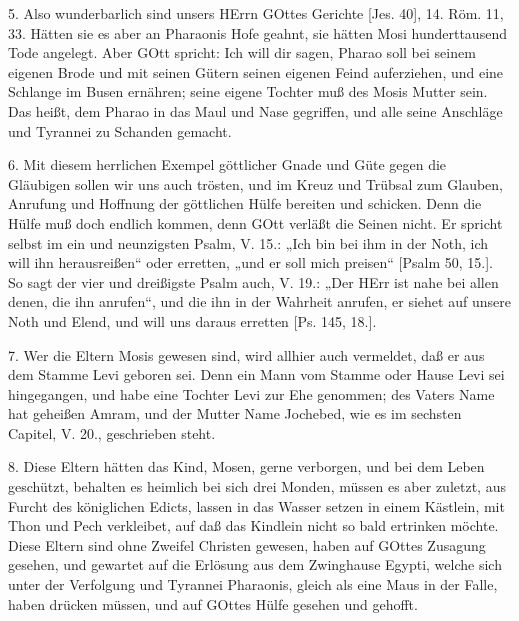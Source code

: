 5. Also wunderbarlich sind unsers HErrn GOttes Gerichte [Jes. 40], 14. Röm. 11, 33. Hätten sie es aber an Pharaonis Hofe geahnt, sie hätten Mosi hunderttausend Tode angelegt. Aber GOtt spricht: Ich will dir sagen, Pharao soll bei seinem eigenen Brode und mit seinen Gütern seinen eigenen Feind auferziehen, und eine Schlange im Busen ernähren; seine eigene Tochter muß des Mosis Mutter sein. Das heißt, dem Pharao in das Maul und Nase gegriffen, und alle seine Anschläge und Tyrannei zu Schanden gemacht.

6. Mit diesem herrlichen Exempel göttlicher Gnade und Güte gegen die Gläubigen sollen wir uns auch trösten, und im Kreuz und Trübsal zum Glauben, Anrufung und Hoffnung der göttlichen Hülfe bereiten und schicken. Denn die Hülfe muß doch endlich kommen, denn GOtt verläßt die Seinen nicht. Er spricht selbst im ein und neunzigsten Psalm, V. 15.: „Ich bin bei ihm in der Noth, ich will ihn herausreißen“ oder erretten, „und er soll mich preisen“ [Psalm 50, 15.]. So sagt der vier und dreißigste Psalm auch, V. 19.: „Der HErr ist nahe bei allen denen, die ihn anrufen“, und die ihn in der Wahrheit anrufen, er siehet auf unsere Noth und Elend, und will uns daraus erretten [Ps. 145, 18.].

7. Wer die Eltern Mosis gewesen sind, wird allhier auch vermeldet, daß er aus dem Stamme Levi geboren sei. Denn ein Mann vom Stamme oder Hause Levi sei hingegangen, und habe eine Tochter Levi zur Ehe genommen; des Vaters Name hat geheißen Amram, und der Mutter Name Jochebed, wie es im sechsten Capitel, V. 20., geschrieben steht.

8. Diese Eltern hätten das Kind, Mosen, gerne verborgen, und bei dem Leben geschützt, behalten es heimlich bei sich drei Monden, müssen es aber zuletzt, aus Furcht des königlichen Edicts, lassen in das Wasser setzen in einem Kästlein, mit Thon und Pech verkleibet, auf daß das Kindlein nicht so bald ertrinken möchte. Diese Eltern sind ohne Zweifel Christen gewesen, haben auf GOttes Zusagung gesehen, und gewartet auf die Erlösung aus dem Zwinghause Egypti, welche sich unter der Verfolgung und Tyrannei Pharaonis, gleich als eine Maus in der Falle, haben drücken müssen, und auf GOttes Hülfe gesehen und gehofft.

